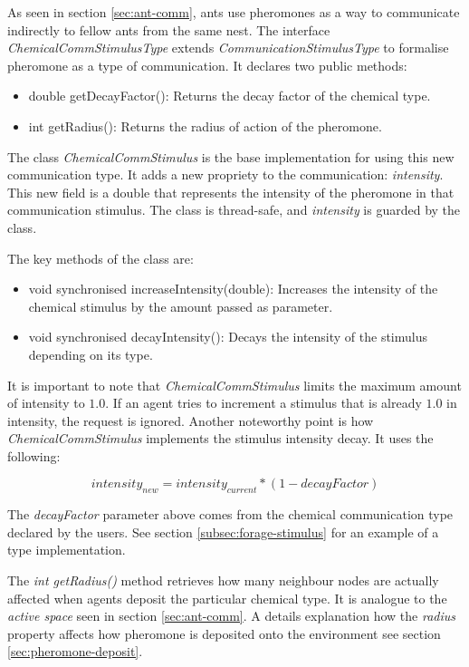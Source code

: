 As seen in section \ref{sec:ant-comm}, ants use pheromones as a way to communicate indirectly to fellow ants from the same nest. The interface \emph{ChemicalCommStimulusType} extends \emph{CommunicationStimulusType} to formalise pheromone as a type of communication. It declares two public methods:

\begin{itemize}
  \item double getDecayFactor(): Returns the decay factor of the chemical type. 
  \item int getRadius(): Returns the radius of action of the pheromone.
\end{itemize}

The class \emph{ChemicalCommStimulus} is the base implementation for using this new communication type. It adds a new propriety to the communication: \emph{intensity}. This new field is a double that represents the intensity of the pheromone in that communication stimulus. The class is thread-safe, and \emph{intensity} is guarded by the class.

The key methods of the class are:

\begin{itemize}
  \item void synchronised increaseIntensity(double): Increases the intensity of the chemical stimulus by the amount passed as parameter.
  
  \item void synchronised decayIntensity(): Decays the intensity of the stimulus depending on its type.
\end{itemize}

It is important to note that \emph{ChemicalCommStimulus} limits the maximum amount of intensity to $1.0$. If an agent tries to increment a stimulus that is already $1.0$ in intensity, the request is ignored.
Another noteworthy point is how \emph{ChemicalCommStimulus} implements the stimulus intensity decay. It uses the following:

\begin{equation} \label{eq:intensity-update}
intensity_{new} = intensity_{current} * (1 - decayFactor)
\end{equation}

The \emph{decayFactor} parameter above comes from the chemical communication type declared by the users. See section \ref{subsec:forage-stimulus} for an example of a type implementation.

The \emph{int getRadius()} method retrieves how many neighbour nodes are actually affected when agents deposit the particular chemical type. It is analogue to the \emph{active space} seen in section \ref{sec:ant-comm}. A details explanation how the \emph{radius} property affects how pheromone is deposited onto the environment see section \ref{sec:pheromone-deposit}.

